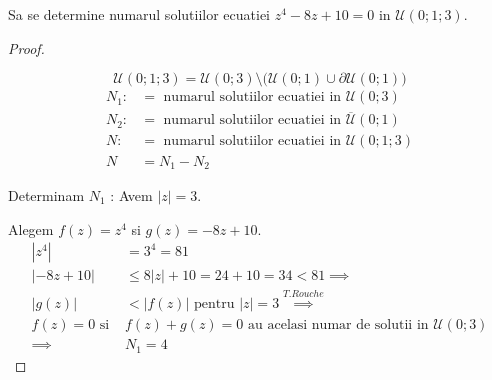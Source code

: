 \begin{aplicatie}
    Sa se determine numarul solutiilor ecuatiei $z^4 -8z + 10 = 0 $ in $\mathcal{U}(0;1;3)$.
    \begin{proof}
        \begin{center}
        \end{center}

        \[
            \mathcal{U}(0;1;3) = \mathcal{U}(0;3)\setminus
                \big(\mathcal{U}(0;1) \cup \partial \mathcal{U}(0;1)\big)
        \]
        \begin{align*}
            N_1 :&= \text{ numarul solutiilor ecuatiei in } \mathcal{U}(0;3) \\
            N_2 :&= \text{ numarul solutiilor ecuatiei in } \overline{\mathcal{U}}(0;1) \\
            N :&= \text{ numarul solutiilor ecuatiei in } \mathcal{U}(0;1;3)  \\
            N &= N_1 - N_2
        \end{align*}

        Determinam $N_1$ : Avem $|z| = 3$.

        Alegem $f(z) = z^4$ si $g(z) = -8z + 10$.
        \begin{align*}
            |z^4| &= 3^4 = 81 \\
            |-8z + 10| &\leq 8|z| + 10 = 24 + 10 = 34 < 81 \implies \\
            |g(z)| &< |f(z)| \text{ pentru } |z| = 3 \overset{T.Rouche}{\implies} \\
            f(z) = 0 \text{ si } & f(z) + g(z) = 0 \text{ au acelasi numar de solutii in }
                \mathcal{U}(0;3) \\
            \implies & N_1 = 4
        \end{align*}


\end{proof}
\end{aplicatie}
